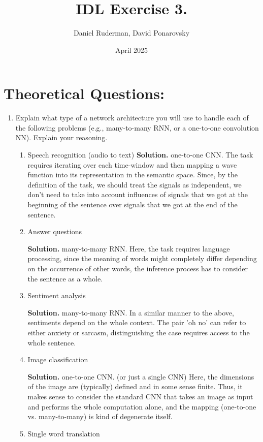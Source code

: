 \documentclass{article}
\title{IDL Exercise 3.}
\author{Daniel Ruderman, David Ponarovsky}
\date{April 2025}
\begin{document}
\maketitle

\section{Theoretical Questions:}

\begin{enumerate}
  \item Explain what type of a network architecture you will use to handle each of the following problems (e.g., many-to-many RNN, or a one-to-one convolution NN). Explain your reasoning. 
    \begin{enumerate}
\item Speech recognition (audio to text) 
  \textbf{Solution.} one-to-one CNN. The task requires iterating over each time-window and then mapping a wave function into its representation in the semantic space. Since, by the definition of the task, we should treat the signals as independent, we don't need to take into account influences of signals that we got at the beginning of the sentence over signals that we got at the end of the sentence.
\item Answer questions


  \textbf{Solution.} many-to-many RNN.  Here, the task requires language processing, since the meaning of words might completely differ depending on the occurrence of other words, the inference process has to consider the sentence as a whole.
\item Sentiment analysis


        \textbf{Solution.} many-to-many RNN. In a similar manner to the above, sentiments depend on the whole context. The pair 'oh no' can refer to either anxiety or sarcasm, distinguishing the case requires access to the whole sentence.
\item Image classification


  \textbf{Solution.} one-to-one CNN. (or just a single CNN) Here, the dimensions of the image are (typically) defined and in some sense finite. Thus, it makes sense to consider the standard CNN that takes an image as input and performs the whole computation alone, and the mapping (one-to-one vs. many-to-many) is kind of degenerate itself.
\item Single word translation



\end{enumerate}
\end{enumerate}
\end{document}
